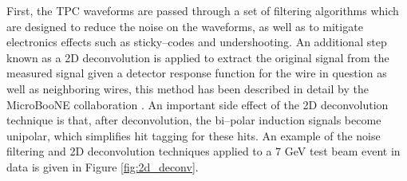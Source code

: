 First, the TPC waveforms are passed through a set of filtering algorithms which
are designed to reduce the noise on the waveforms, as well as to mitigate 
electronics effects such as sticky--codes and undershooting. An additional step
known as a 2D deconvolution is applied to extract the original signal from the
measured signal given a detector response function for the wire in question as
well as neighboring wires, this method has been described in detail by the 
MicroBooNE collaboration \cite{Adams:2018dra}. An important side
effect of the 2D deconvolution technique is that, after deconvolution, the
bi--polar induction signals become unipolar, which simplifies hit tagging for
these hits. An example of the noise filtering and 2D deconvolution techniques 
applied to a 7 GeV test beam event in \protodune{} data is given in Figure 
\ref{fig:2d_deconv}. 

